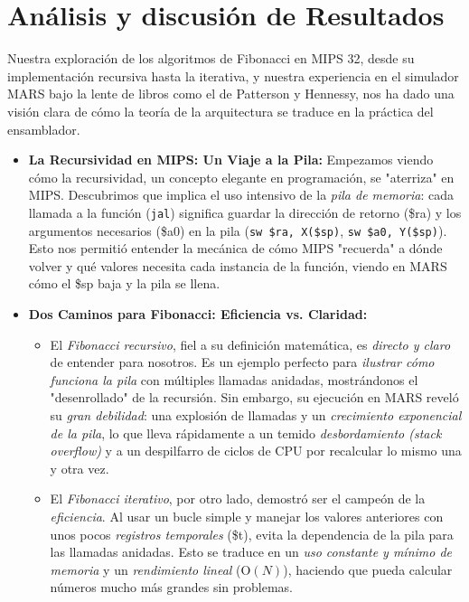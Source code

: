 \documentclass{article}
\begin{document}
\section*{Análisis y discusión de Resultados}

Nuestra exploración de los algoritmos de Fibonacci en MIPS 32, desde su implementación recursiva hasta la iterativa, y nuestra experiencia en el simulador MARS bajo la lente de libros como el de Patterson y Hennessy, nos ha dado una visión clara de cómo la teoría de la arquitectura se traduce en la práctica del ensamblador.

\begin{itemize}
    \item \textbf{La Recursividad en MIPS: Un Viaje a la Pila:} Empezamos viendo cómo la recursividad, un concepto elegante en programación, se "aterriza" en MIPS. Descubrimos que implica el uso intensivo de la \textit{pila de memoria}: cada llamada a la función (\texttt{jal}) significa guardar la dirección de retorno (\$ra) y los argumentos necesarios (\$a0) en la pila (\texttt{sw \$ra, X(\$sp)}, \texttt{sw \$a0, Y(\$sp)}). Esto nos permitió entender la mecánica de cómo MIPS "recuerda" a dónde volver y qué valores necesita cada instancia de la función, viendo en MARS cómo el \$sp baja y la pila se llena.
    \item \textbf{Dos Caminos para Fibonacci: Eficiencia vs. Claridad:}
    \begin{itemize}
        \item El \textit{Fibonacci recursivo}, fiel a su definición matemática, es \textit{directo y claro} de entender para nosotros. Es un ejemplo perfecto para \textit{ilustrar cómo funciona la pila} con múltiples llamadas anidadas, mostrándonos el "desenrollado" de la recursión. Sin embargo, su ejecución en MARS reveló su \textit{gran debilidad}: una explosión de llamadas y un \textit{crecimiento exponencial de la pila}, lo que lleva rápidamente a un temido \textit{desbordamiento (stack overflow)} y a un despilfarro de ciclos de CPU por recalcular lo mismo una y otra vez.
        \item El \textit{Fibonacci iterativo}, por otro lado, demostró ser el campeón de la \textit{eficiencia}. Al usar un bucle simple y manejar los valores anteriores con unos pocos \textit{registros temporales} (\$t), evita la dependencia de la pila para las llamadas anidadas. Esto se traduce en un \textit{uso constante y mínimo de memoria} y un \textit{rendimiento lineal} ($\text{O}(N)$), haciendo que pueda calcular números mucho más grandes sin problemas.

\end{itemize}
\end{itemize}
\end{document}
